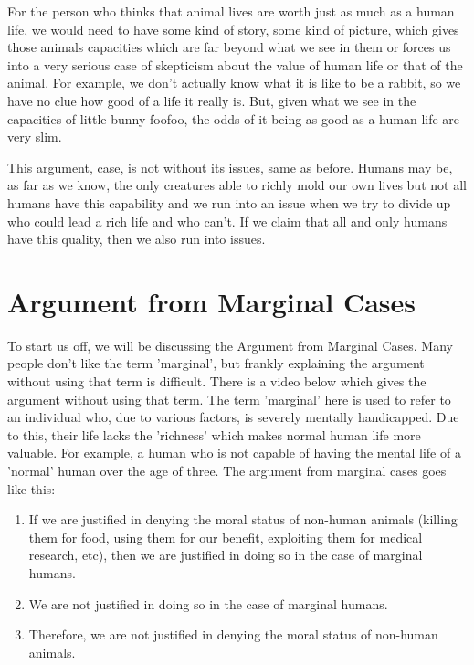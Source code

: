 For the person who thinks that animal lives are worth just as much as a human life, we would need to have some kind of story, some kind of picture, which gives those animals capacities which are far beyond what we see in them or forces us into a very serious case of skepticism about the value of human life or that of the animal. For example, we don’t actually know what it is like to be a rabbit, so we have no clue how good of a life it really is. But, given what we see in the capacities of little bunny foofoo, the odds of it being as good as a human life are very slim. 

This argument, case, is not without its issues, same as before. Humans may be, as far as we know, the only creatures able to richly mold our own lives but not all humans have this capability and we run into an issue when we try to divide up who could lead a rich life and who can't. If we claim that all and only humans have this quality, then we also run into issues.

\section{Argument from Marginal Cases}

To start us off, we will be discussing the Argument from Marginal Cases. Many people don't like the term 'marginal', but frankly explaining the argument without using that term is difficult. There is a video below which gives the argument without using that term. The term 'marginal' here is used to refer to an individual who, due to various factors, is severely mentally handicapped. Due to this, their life lacks the 'richness' which makes normal human life more valuable. For example, a human who is not capable of having the mental life of a 'normal' human over the age of three. The argument from marginal cases goes like this:

\begin{enumerate}
    \item If we are justified in denying the moral status of non-human animals (killing them for food, using them for our benefit, exploiting them for medical research, etc), then we are justified in doing so in the case of marginal humans.
    \item We are not justified in doing so in the case of marginal humans.
    \item Therefore, we are not justified in denying the moral status of non-human animals.
\end{enumerate}


